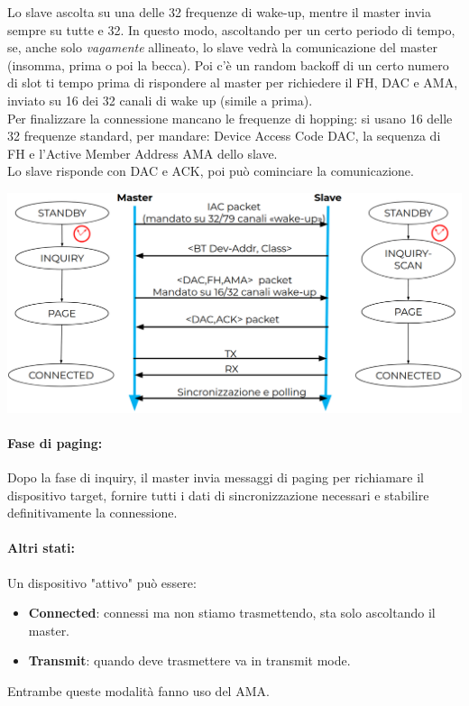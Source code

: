 Lo slave ascolta su una delle 32 frequenze di wake-up, mentre il master invia sempre su tutte e 32. In questo modo, ascoltando per un certo periodo di tempo, se, anche solo \textit{vagamente} allineato, lo slave vedrà la comunicazione del master (insomma, prima o poi la becca). Poi c'è un random backoff di un certo numero di slot ti tempo prima di rispondere al master per richiedere il FH, DAC e AMA, inviato su 16 dei 32 canali di wake up (simile a prima).\\

Per finalizzare la connessione mancano le frequenze di hopping: si usano 16 delle 32 frequenze standard, per mandare: Device Access Code DAC, la sequenza di FH e l'Active Member Address AMA dello slave.\\

Lo slave risponde con DAC e ACK, poi può cominciare la comunicazione.
\begin{center}
	\includegraphics[width=0.95\linewidth]{img/wpan/inquiry1}
\end{center}


\paragraph{Fase di paging:} Dopo la fase di inquiry, il master invia messaggi di paging per richiamare il dispositivo target, fornire tutti i dati di sincronizzazione necessari e stabilire definitivamente la connessione.\\

\newpage

\paragraph{Altri stati:} Un dispositivo "attivo" può essere:
\begin{itemize}
	\item \textbf{Connected}: connessi ma non stiamo trasmettendo, sta solo ascoltando il master.
	\item \textbf{Transmit}: quando deve trasmettere va in transmit mode.
\end{itemize}
Entrambe queste modalità fanno uso del AMA. \\

